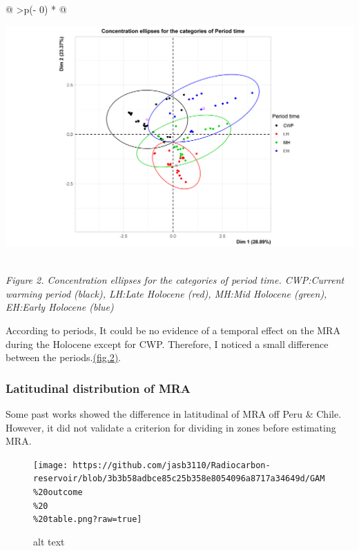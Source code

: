 \documentclass[
]{article}
\begin{document}
\begin{longtable}[]{@{}
  >{\centering\arraybackslash}p{(\columnwidth - 0\tabcolsep) * }@{}}
\toprule
\begin{minipage}[b]{\linewidth}\centering
\href{https://github.com/jasb3110/Radiocarbon-reservoir/blob/db842ff0620d55ea5ca5ceec0d96a369406b6e3c/plotellipses.period.png?raw=true}{\includegraphics{plotellipses.period.png}}
\end{minipage} \\
\midrule
\endhead
\emph{Figure 2. Concentration ellipses for the categories of period
time. CWP:Current warming period (black), LH:Late Holocene (red), MH:Mid
Holocene (green), EH:Early Holocene (blue)} \\
\bottomrule
\end{longtable}

According to periods, It could be no evidence of a temporal effect on
the MRA during the Holocene except for CWP. Therefore, I noticed a small
difference between the
periods.\protect\hyperlink{Clusters-of-mra-for-period-time}{(fig.2)}.

\hypertarget{latitudinal-distribution-of-mra}{%
\subsubsection{Latitudinal distribution of
MRA}\label{latitudinal-distribution-of-mra}}

Some past works showed the difference in latitudinal of MRA off Peru \&
Chile. However, it did not validate a criterion for dividing in zones
before estimating MRA.

\begin{figure}
\centering
\texttt{[image: https://github.com/jasb3110/Radiocarbon-reservoir/blob/3b3b58adbce85c25b358e8054096a8717a34649d/GAM\\\%20outcome\\\%20\\\%20table.png?raw=true]}
\caption{alt text}
\end{figure}
\end{document}
